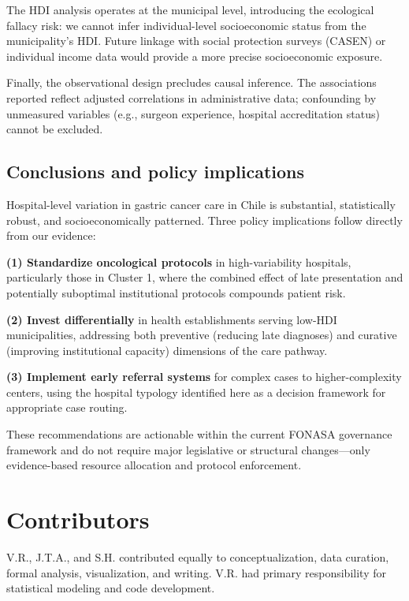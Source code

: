 \documentclass[10pt,twocolumn]{article}
\begin{document}
The HDI analysis operates at the municipal level, introducing the ecological fallacy
risk: we cannot infer individual-level socioeconomic status from the municipality's
HDI. Future linkage with social protection surveys (CASEN) or individual income data
would provide a more precise socioeconomic exposure.

Finally, the observational design precludes causal inference. The associations
reported reflect adjusted correlations in administrative data; confounding by
unmeasured variables (e.g., surgeon experience, hospital accreditation status)
cannot be excluded.

\subsection{Conclusions and policy implications}

Hospital-level variation in gastric cancer care in Chile is substantial, statistically
robust, and socioeconomically patterned. Three policy implications follow directly
from our evidence:

\textbf{(1) Standardize oncological protocols} in high-variability hospitals, particularly
those in Cluster 1, where the combined effect of late presentation and potentially
suboptimal institutional protocols compounds patient risk.

\textbf{(2) Invest differentially} in health establishments serving low-HDI municipalities,
addressing both preventive (reducing late diagnoses) and curative (improving institutional
capacity) dimensions of the care pathway.

\textbf{(3) Implement early referral systems} for complex cases to higher-complexity
centers, using the hospital typology identified here as a decision framework for
appropriate case routing.

These recommendations are actionable within the current FONASA governance framework
and do not require major legislative or structural changes—only evidence-based
resource allocation and protocol enforcement.

\section*{Contributors}
V.R., J.T.A., and S.H. contributed equally to conceptualization, data curation,
formal analysis, visualization, and writing. V.R. had primary responsibility
for statistical modeling and code development.
\end{document}
